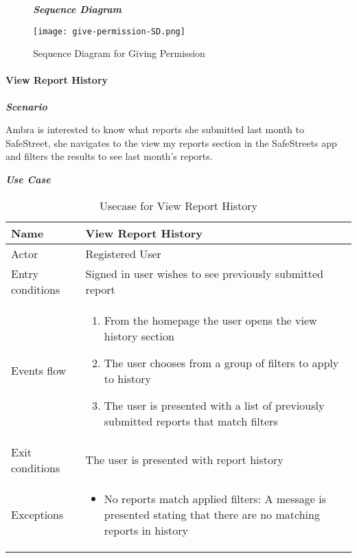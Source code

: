\begin{figure}[H]
\begin{flushleft}\emph{\textbf{Sequence Diagram}}\end{flushleft}
\caption{Sequence Diagram for Giving Permission}
\label{fig:SD-Give-Permission}
\centering
\texttt{[image: give-permission-SD.png]}
\end{figure}

\paragraph{View Report History}
\hfill \break

\begin{flushleft}\emph{\textbf{Scenario}}\end{flushleft}

Ambra is interested to know what reports she submitted last month to SafeStreet, she navigates to the view my reports section in the SafeStreets app and filters the results to see last month’s reports.


\begin{table}[H]
\begin{flushleft}\emph{\textbf{Use Case}}\end{flushleft}
\footnotesize
\centering
\settowidth{}
\setlength\extrarowheight{2pt}
\begin{tabulary}{\textwidth}{|J|J|}
\hline
Name             & View Report History \\
\hline 
Actor            & Registered User \\ 
\hline 
Entry conditions & Signed in user wishes to see previously submitted report\\
\hline 
Events flow      & 
\begin{minipage}[t]{0.7\textwidth}
\begin{enumerate} 
\item From the homepage the user opens the view history section
\item The user chooses from a group of filters to apply to history
\item The user is presented with a list of previously submitted reports that match filters
\end{enumerate}
\end{minipage}\\
\hline
Exit conditions  & The user is presented with report history \\
\hline 
Exceptions       & 
\begin{minipage}[t]{0.8\textwidth}
\begin{itemize} 
\item No reports match applied filters: A message is presented stating that there are no matching reports in history
\end{itemize}
\end{minipage}\\
\hline
\end{tabulary}
\caption{\label{tab:Usecase-View-Report-History}Usecase for View Report History}
\end{table}

